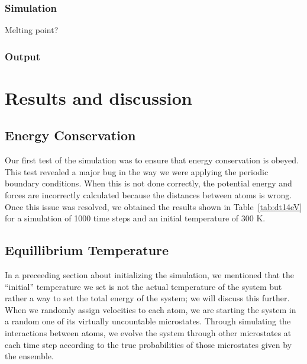 \documentclass[10pt,showpacs,preprintnumbers,footinbib,amsmath,amssymb,aps,prl,twocolumn,groupedaddress,superscriptaddress,showkeys]{revtex4-1}
\begin{document}
\subsubsection*{Simulation}

Melting point?



\subsubsection*{Output}



\section*{Results and discussion}

\subsection*{Energy Conservation}

Our first test of the simulation was to ensure that energy conservation
is obeyed. This test revealed a major bug in the way we were applying
the periodic boundary conditions. When this is not done correctly, the
potential energy and forces are incorrectly calculated because the
distances between atoms is wrong. Once this issue was resolved, we
obtained the results shown in Table~\ref{tab:dt14eV} for a simulation
of 1000 time steps and an initial temperature of 300 K.



\subsection*{Equillibrium Temperature}

In a preceeding section about initializing the simulation, we mentioned
that the ``initial'' temperature we set is not the actual temperature of the
system but rather a way to set the total energy of the system; we will
discuss this further. When we randomly assign velocities to each atom,
we are starting the system in a random one of its virtually uncountable
microstates. Through simulating the interactions between atoms, we
evolve the system through other microstates at each time step according
to the true probabilities of those microstates given by the ensemble.


\end{document}
